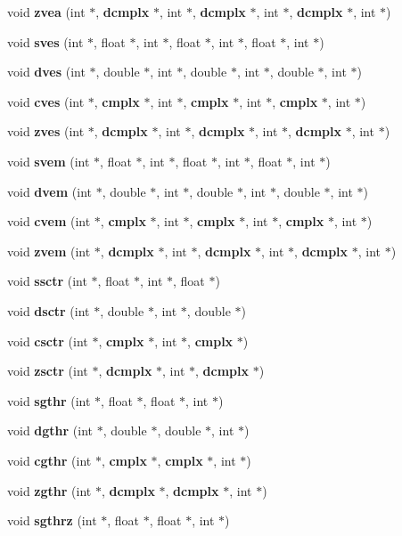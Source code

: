 \begin{CompactItemize}
void {\bf zvea} (int $\ast$, {\bf dcmplx} $\ast$, int $\ast$, {\bf dcmplx} $\ast$, int $\ast$, {\bf dcmplx} $\ast$, int $\ast$)
\item 
void {\bf sves} (int $\ast$, float $\ast$, int $\ast$, float $\ast$, int $\ast$, float $\ast$, int $\ast$)
\item 
void {\bf dves} (int $\ast$, double $\ast$, int $\ast$, double $\ast$, int $\ast$, double $\ast$, int $\ast$)
\item 
void {\bf cves} (int $\ast$, {\bf cmplx} $\ast$, int $\ast$, {\bf cmplx} $\ast$, int $\ast$, {\bf cmplx} $\ast$, int $\ast$)
\item 
void {\bf zves} (int $\ast$, {\bf dcmplx} $\ast$, int $\ast$, {\bf dcmplx} $\ast$, int $\ast$, {\bf dcmplx} $\ast$, int $\ast$)
\item 
void {\bf svem} (int $\ast$, float $\ast$, int $\ast$, float $\ast$, int $\ast$, float $\ast$, int $\ast$)
\item 
void {\bf dvem} (int $\ast$, double $\ast$, int $\ast$, double $\ast$, int $\ast$, double $\ast$, int $\ast$)
\item 
void {\bf cvem} (int $\ast$, {\bf cmplx} $\ast$, int $\ast$, {\bf cmplx} $\ast$, int $\ast$, {\bf cmplx} $\ast$, int $\ast$)
\item 
void {\bf zvem} (int $\ast$, {\bf dcmplx} $\ast$, int $\ast$, {\bf dcmplx} $\ast$, int $\ast$, {\bf dcmplx} $\ast$, int $\ast$)
\item 
void {\bf ssctr} (int $\ast$, float $\ast$, int $\ast$, float $\ast$)
\item 
void {\bf dsctr} (int $\ast$, double $\ast$, int $\ast$, double $\ast$)
\item 
void {\bf csctr} (int $\ast$, {\bf cmplx} $\ast$, int $\ast$, {\bf cmplx} $\ast$)
\item 
void {\bf zsctr} (int $\ast$, {\bf dcmplx} $\ast$, int $\ast$, {\bf dcmplx} $\ast$)
\item 
void {\bf sgthr} (int $\ast$, float $\ast$, float $\ast$, int $\ast$)
\item 
void {\bf dgthr} (int $\ast$, double $\ast$, double $\ast$, int $\ast$)
\item 
void {\bf cgthr} (int $\ast$, {\bf cmplx} $\ast$, {\bf cmplx} $\ast$, int $\ast$)
\item 
void {\bf zgthr} (int $\ast$, {\bf dcmplx} $\ast$, {\bf dcmplx} $\ast$, int $\ast$)
\item 
void {\bf sgthrz} (int $\ast$, float $\ast$, float $\ast$, int $\ast$)
\item 

\end{CompactItemize}
